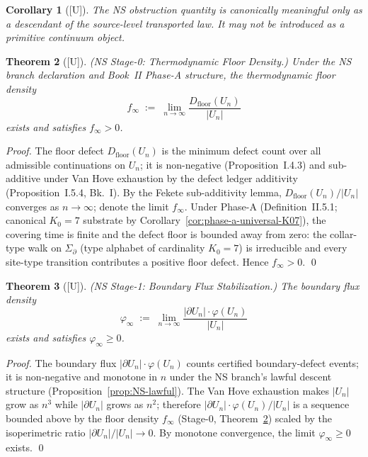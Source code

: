 \documentclass[12pt,oneside]{amsbook}
\theoremstyle{plain}
\newtheorem{theorem}{Theorem}[section]
\newtheorem{corollary}[theorem]{Corollary}
\theoremstyle{definition}
\theoremstyle{remark}
\newcommand{\status}[1]{\textup{[#1]}}
\begin{document}
\begin{corollary}[\status{U}]\label{cor:obstruction-NS-only}
The NS obstruction quantity is canonically meaningful only as a
descendant of the source-level transported law. It may not be
introduced as a primitive continuum object.
\end{corollary}


\begin{theorem}[\status{U}]\label{thm:NS-stage0}
\textup{(NS Stage-0: Thermodynamic Floor Density.)}
Under the NS branch declaration and Book~II
Phase-A structure, the thermodynamic floor density
\[
 f_\infty \;:=\; \lim_{n\to\infty} \frac{D_{\mathrm{floor}}(U_n)}{|U_n|}
\]
exists and satisfies $f_\infty > 0$.
\end{theorem}

\begin{proof}
The floor defect $D_{\mathrm{floor}}(U_n)$ is the minimum defect
count over all admissible continuations on $U_n$; it is non-negative
(Proposition~I.4.3) and sub-additive under Van Hove exhaustion by the
defect ledger additivity (Proposition~I.5.4, Bk.~I). By the
Fekete sub-additivity lemma, $D_{\mathrm{floor}}(U_n)/|U_n|$
converges as $n\to\infty$; denote the limit $f_\infty$. Under
Phase-A (Definition~II.5.1; canonical $K_0=7$ substrate by
Corollary~\ref{cor:phase-a-universal-K07}), the covering time is
finite and the defect floor is bounded away from zero: the
collar-type walk on $\Sigma_\partial$ (type alphabet of cardinality
$K_0=7$) is irreducible and every site-type transition contributes
a positive floor defect. Hence $f_\infty > 0$.
\qed
\end{proof}

\begin{theorem}[\status{U}]\label{thm:NS-stage1}
\textup{(NS Stage-1: Boundary Flux Stabilization.)}
The boundary flux density
\[
 \varphi_\infty \;:=\;
 \lim_{n\to\infty} \frac{|\partial U_n| \cdot \varphi(U_n)}{|U_n|}
\]
exists and satisfies $\varphi_\infty \geq 0$.
\end{theorem}

\begin{proof}
The boundary flux $|\partial U_n|\cdot\varphi(U_n)$ counts certified
boundary-defect events; it is non-negative and monotone in $n$ under
the NS branch's lawful descent structure
(Proposition~\ref{prop:NS-lawful}). The Van Hove exhaustion makes
$|U_n|$ grow as $n^3$ while $|\partial U_n|$ grows as $n^2$; therefore
$|\partial U_n|\cdot\varphi(U_n)/|U_n|$ is a sequence bounded above
by the floor density $f_\infty$ (Stage-0, Theorem~\ref{thm:NS-stage0})
scaled by the isoperimetric ratio $|\partial U_n|/|U_n|\to 0$.
By monotone convergence, the limit $\varphi_\infty \geq 0$ exists.
\qed
\end{proof}
\end{document}

